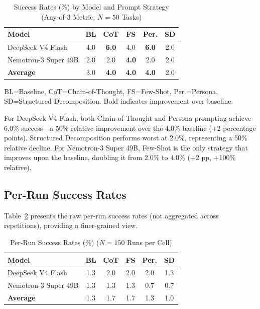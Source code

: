 \documentclass{ieeeaccess}
\begin{document}
\begin{table}[t]
\caption{Success Rates (\%) by Model and Prompt Strategy (Any-of-3 Metric, $N=50$ Tasks)}
\label{tab:results_main}
\centering
\begin{tabular}{lccccc}
\toprule
\textbf{Model} & \textbf{BL} & \textbf{CoT} & \textbf{FS} & \textbf{Per.} & \textbf{SD} \\
\midrule
DeepSeek V4 Flash & 4.0 & \textbf{6.0} & 4.0 & \textbf{6.0} & 2.0 \\
Nemotron-3 Super 49B & 2.0 & 2.0 & \textbf{4.0} & 2.0 & 2.0 \\
\midrule
\textbf{Average} & 3.0 & \textbf{4.0} & \textbf{4.0} & \textbf{4.0} & 2.0 \\
\bottomrule
\end{tabular}
\begin{tablenotes}
\footnotesize
\item BL=Baseline, CoT=Chain-of-Thought, FS=Few-Shot, Per.=Persona, SD=Structured Decomposition. Bold indicates improvement over baseline.
\end{tablenotes}
\end{table}

For DeepSeek V4 Flash, both Chain-of-Thought and Persona prompting achieve 6.0\% success---a 50\% relative improvement over the 4.0\% baseline (+2 percentage points). Structured Decomposition performs worst at 2.0\%, representing a 50\% relative decline. For Nemotron-3 Super 49B, Few-Shot is the only strategy that improves upon the baseline, doubling it from 2.0\% to 4.0\% (+2 pp, +100\% relative).

\subsection{Per-Run Success Rates}

Table~\ref{tab:results_perrun} presents the raw per-run success rates (not aggregated across repetitions), providing a finer-grained view.

\begin{table}[t]
\caption{Per-Run Success Rates (\%) ($N=150$ Runs per Cell)}
\label{tab:results_perrun}
\centering
\begin{tabular}{lccccc}
\toprule
\textbf{Model} & \textbf{BL} & \textbf{CoT} & \textbf{FS} & \textbf{Per.} & \textbf{SD} \\
\midrule
DeepSeek V4 Flash & 1.3 & 2.0 & 2.0 & 2.0 & 1.3 \\
Nemotron-3 Super 49B & 1.3 & 1.3 & 1.3 & 0.7 & 0.7 \\
\midrule
\textbf{Average} & 1.3 & 1.7 & 1.7 & 1.3 & 1.0 \\
\bottomrule
\end{tabular}
\end{table}
\end{document}
